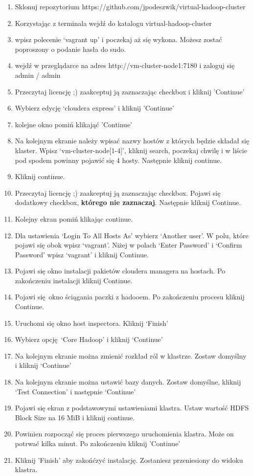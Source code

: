 \documentclass[11pt]{article}
\begin{document}
\begin{enumerate}
\item Sklonuj repozytorium https://github.com/jpodeszwik/virtual-hadoop-cluster
\item Korzystając z terminala wejdź do katalogu virtual-hadoop-cluster
\item wpisz polecenie ‘vagrant up’ i poczekaj aż się wykona. Możesz zostać poproszony o podanie hasła do sudo.
\item wejdź w przeglądarce na adres http://vm-cluster-node1:7180 i zaloguj się admin / admin
\item Przeczytaj licencję ;) zaakceptuj ją zaznaczając checkbox i kliknij 'Continue'
\item Wybierz edycję ‘cloudera express’ i kliknij 'Continue'
\item kolejne okno pomiń klikająć 'Continue'
\item Na kolejnym ekranie należy wpisać nazwy hostów z których będzie składał się klaster. Wpisz ‘vm-cluster-node[1-4]’, kliknij search, poczekaj chwilę i w liście pod spodem powinny pojawić się 4 hosty. Następnie kliknij continue.
\item Kliknij continue.
\item Przeczytaj licencję ;) zaakceptuj ją zaznaczając checkbox. Pojawi się dodatkowy checkbox, \textbf{którego nie zaznaczaj}. Następnie kliknij Continue.
\item Kolejny ekran pomiń klikając continue.
\item Dla ustawienia ‘Login To All Hosts As’ wybierz ‘Another user’. W polu, które pojawi się obok wpisz ‘vagrant’. Niżej w polach ‘Enter Password’ i ‘Confirm Password’ wpisz ‘vagrant’ i kliknij Continue.
\item Pojawi się okno instalacji pakietów cloudera managera na hostach. Po zakończeniu instalacji kliknij Continue.
\item Pojawi się okno ściągania paczki z hadooem. Po zakończeniu procesu kliknij Continue.
\item Uruchomi się okno host inspectora. Kliknij ‘Finish’
\item Wybierz opcję ‘Core Hadoop’ i kliknij ‘Continue’
\item Na kolejnym ekranie można zmienić rozkład ról w klastrze. Zostaw domyślny i kliknij ‘Continue’
\item Na kolejnym ekranie można ustawić bazy danych. Zostaw domyślne, kliknij ‘Test Connection’ i następnie ‘Continue’
\item Pojawi się ekran z podstawowymi ustawieniami klastra. Ustaw wartość HDFS Block Size  na 16 MiB i kliknij continue.
\item Powinien rozpocząć się proces pierwszego uruchomienia klastra. Może on potrwać kilka minut. Po zakończeniu kliknij 'Continue'
\item Kliknij 'Finish' aby zakońćzyć instalację. Zostaniesz przeniesiony do widoku klastra.
\end{enumerate}
\end{document}
